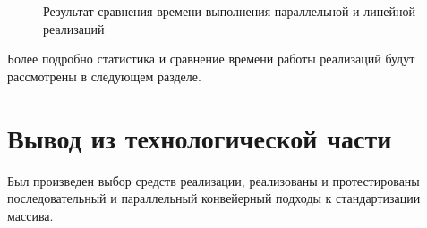 \begin{figure}[h!]
	
	
	\caption{Результат сравнения времени выполнения параллельной и линейной реализаций}
	
	\label{fig:work_example3}
	
\end{figure}

Более подробно статистика и сравнение времени работы реализаций будут рассмотрены в следующем разделе.



\section{Вывод из технологической части}

Был произведен выбор средств реализации,  реализованы и протестированы последовательный и параллельный конвейерный подходы к стандартизации массива.
